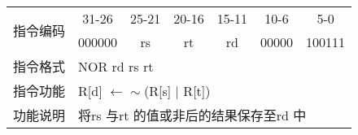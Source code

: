 \documentclass[a4paper,UTF8,fntef]{ctexart}
\begin{document}
	\begin{table}[!hbp]
		\centering
		\begin{tabular}{|c|c|c|c|c|c|c|}
		\hline
		\multirow{2}{*}{指令编码} & 31-26&25-21 & 20-16&15-11 &10-6 &5-0\\
		\cline{2-7} & 000000 & rs & rt & rd & 00000 & 100111 \\
		\hline
		指令格式&\multicolumn{6}{|l|}{NOR rd rs rt}\\
		\hline		
		指令功能&\multicolumn{6}{|l|}{R[d] $\leftarrow \sim$(R[s] $|$ R[t])}\\
		\hline		
		功能说明&\multicolumn{6}{|l|}{将rs 与rt 的值或非后的结果保存至rd 中}\\
		\hline
		\end{tabular}
	\end{table}
\newpage
\end{document}
